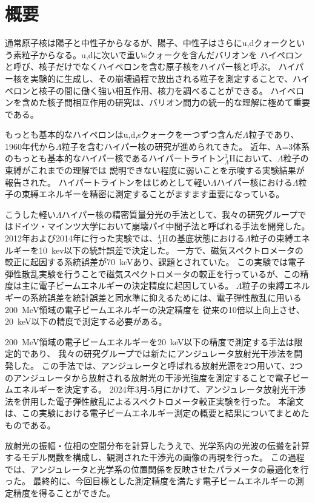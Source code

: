 \documentclass[a4paper,11pt,uplatex]{jsbook}
\begin{document}
\chapter*{概要}
通常原子核は陽子と中性子からなるが、陽子、中性子はさらにu,dクォークという素粒子からなる。u,dに次いで重いsクォークを含んだバリオンを
ハイペロンと呼び、核子だけでなくハイペロンを含む原子核をハイパー核と呼ぶ。
ハイパー核を実験的に生成し、その崩壊過程で放出される粒子を測定することで、ハイペロンと核子の間に働く強い相互作用、核力を調べることができる。
ハイペロンを含めた核子間相互作用の研究は、バリオン間力の統一的な理解に極めて重要である。

もっとも基本的なハイペロンはu,d,sクォークを一つずつ含んだ$\Lambda$粒子であり、1960年代から$\Lambda$粒子を含むハイパー核の研究が進められてきた。
近年、A=3体系のもっとも基本的なハイパー核であるハイパートライトン$_{\Lambda}^3\text{H}$において、$\Lambda$粒子の束縛がこれまでの理解では
説明できない程度に弱いことを示唆する実験結果が報告された。
ハイパートライトンをはじめとして軽い$\Lambda$ハイパー核における$\Lambda$粒子の束縛エネルギーを精密に測定することがますます重要になっている。

こうした軽い$\Lambda$ハイパー核の精密質量分光の手法として、我々の研究グループではドイツ・マインツ大学において崩壊パイ中間子法と呼ばれる手法を開発した。
2012年および2014年に行った実験では、$_{\Lambda}^4\text{H}$の基底状態における$\Lambda$粒子の束縛エネルギーを10~kev以下の統計誤差で決定した。
一方で、磁気スペクトロメータの較正に起因する系統誤差が70~keVあり、課題とされていた。
この実験では電子弾性散乱実験を行うことで磁気スペクトロメータの較正を行っているが、この精度は主に電子ビームエネルギーの決定精度に起因している。
$\Lambda$粒子の束縛エネルギーの系統誤差を統計誤差と同水準に抑えるためには、電子弾性散乱に用いる200~MeV領域の電子ビームエネルギーの決定精度を
従来の10倍以上向上させ、$20$~keV以下の精度で測定する必要がある。

200~MeV領域の電子ビームエネルギーを$20$~keV以下の精度で測定する手法は限定的であり、
我々の研究グループでは新たにアンジュレータ放射光干渉法を開発した。
この手法では、アンジュレータと呼ばれる放射光源を2つ用いて、2つのアンジュレータから放射される放射光の干渉光強度を測定することで電子ビームエネルギーを決定する。
2024年3月-5月にかけて、アンジュレータ放射光干渉法を併用した電子弾性散乱によるスペクトロメータ較正実験を行った。
本論文は、この実験における電子ビームエネルギー測定の概要と結果についてまとめたものである。

放射光の振幅・位相の空間分布を計算したうえで、光学系内の光波の伝搬を計算するモデル関数を構成し、観測された干渉光の画像の再現を行った。
この過程では、アンジュレータと光学系の位置関係を反映させたパラメータの最適化を行った。
最終的に、今回目標とした測定精度を満たす電子ビームエネルギーの測定精度を得ることができた。
\end{document}

